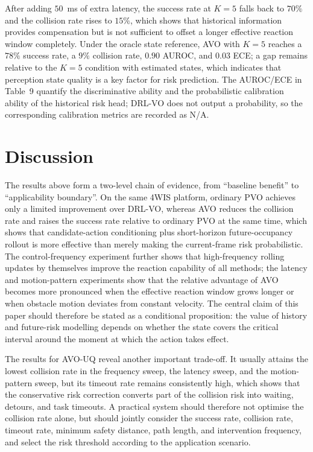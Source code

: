 \documentclass[10pt,a4paper,twocolumn]{article}
\begin{document}
After adding $50$~ms of extra latency, the success rate at $K=5$ falls back to $70\%$ and the collision rate rises to $15\%$, which shows that historical information provides compensation but is not sufficient to offset a longer effective reaction window completely. Under the oracle state reference, AVO with $K=5$ reaches a $78\%$ success rate, a $9\%$ collision rate, $0.90$ AUROC, and $0.03$ ECE; a gap remains relative to the $K=5$ condition with estimated states, which indicates that perception state quality is a key factor for risk prediction. The AUROC/ECE in Table~9 quantify the discriminative ability and the probabilistic calibration ability of the historical risk head; DRL-VO does not output a probability, so the corresponding calibration metrics are recorded as N/A.

\section{Discussion}

The results above form a two-level chain of evidence, from ``baseline benefit'' to ``applicability boundary''. On the same 4WIS platform, ordinary PVO achieves only a limited improvement over DRL-VO, whereas AVO reduces the collision rate and raises the success rate relative to ordinary PVO at the same time, which shows that candidate-action conditioning plus short-horizon future-occupancy rollout is more effective than merely making the current-frame risk probabilistic. The control-frequency experiment further shows that high-frequency rolling updates by themselves improve the reaction capability of all methods; the latency and motion-pattern experiments show that the relative advantage of AVO becomes more pronounced when the effective reaction window grows longer or when obstacle motion deviates from constant velocity. The central claim of this paper should therefore be stated as a conditional proposition: the value of history and future-risk modelling depends on whether the state covers the critical interval around the moment at which the action takes effect.

The results for AVO-UQ reveal another important trade-off. It usually attains the lowest collision rate in the frequency sweep, the latency sweep, and the motion-pattern sweep, but its timeout rate remains consistently high, which shows that the conservative risk correction converts part of the collision risk into waiting, detours, and task timeouts. A practical system should therefore not optimise the collision rate alone, but should jointly consider the success rate, collision rate, timeout rate, minimum safety distance, path length, and intervention frequency, and select the risk threshold according to the application scenario.
\end{document}
